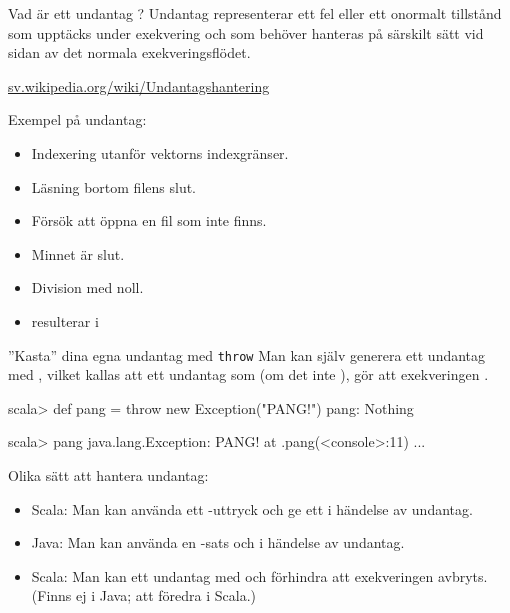 



\begin{Slide}{Vad är ett undantag ?}
Undantag representerar ett fel eller ett onormalt tillstånd som upptäcks under exekvering och som  behöver hanteras på särskilt sätt vid sidan av det normala exekveringsflödet.

\vspace{1em}\href{https://sv.wikipedia.org/wiki/Undantagshantering}{sv.wikipedia.org/wiki/Undantagshantering}


\vspace{1em} Exempel på undantag:

\pause

\begin{itemize}
\item Indexering utanför vektorns indexgränser.

\item Läsning bortom filens slut.

\item Försök att öppna en fil som inte finns.

\item Minnet är slut.

\item Division med noll.

\item {} resulterar i \\

\end{itemize}

\end{Slide}

\begin{Slide}{''Kasta'' dina egna undantag med \texttt{throw}}\SlideFontSmall
Man kan själv generera ett undantag med , vilket kallas att  ett undantag som (om det inte ), gör att exekveringen .


\begin{REPL}
scala> def pang = throw new Exception("PANG!")
pang: Nothing

scala> pang
java.lang.Exception: PANG!
  at .pang(<console>:11)
  ...

\end{REPL}
\pause
Olika sätt att hantera undantag:
\begin{itemize}
\item Scala: Man kan använda ett -uttryck och ge ett  i händelse av undantag.
\item Java: Man kan använda en -sats och  i händelse av undantag.

\item Scala: Man kan  ett undantag med  och förhindra att exekveringen avbryts. (Finns ej i Java; att föredra i Scala.)
\end{itemize}
\end{Slide}



